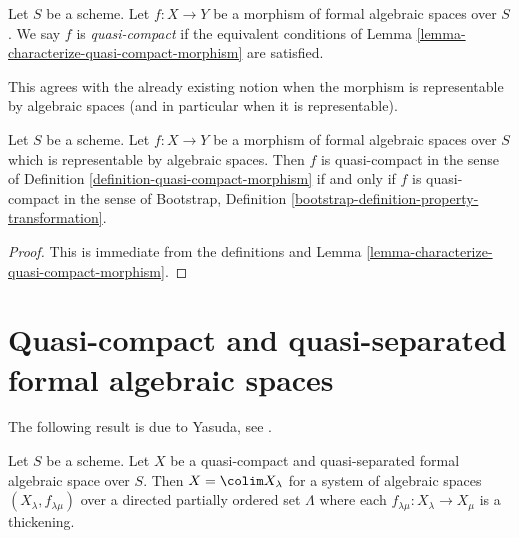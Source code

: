 \begin{definition}
\label{definition-quasi-compact-morphism}
Let $S$ be a scheme. Let $f : X \to Y$ be a morphism of
formal algebraic spaces over $S$.
We say $f$ is {\it quasi-compact} if the equivalent conditions of
Lemma \ref{lemma-characterize-quasi-compact-morphism} are satisfied.
\end{definition}

\noindent
This agrees with the already existing notion when the morphism
is representable by algebraic spaces (and in particular when it is
representable).

\begin{lemma}
\label{lemma-quasi-compact-representable}
Let $S$ be a scheme. Let $f : X \to Y$ be a morphism of formal algebraic
spaces over $S$ which is representable by algebraic spaces.
Then $f$ is quasi-compact in the sense of
Definition \ref{definition-quasi-compact-morphism}
if and only if $f$ is quasi-compact in the sense of
Bootstrap, Definition \ref{bootstrap-definition-property-transformation}.
\end{lemma}

\begin{proof}
This is immediate from the definitions and
Lemma \ref{lemma-characterize-quasi-compact-morphism}.
\end{proof}





\section{Quasi-compact and quasi-separated formal algebraic spaces}
\label{section-quasi-compact-quasi-separated}

\noindent
The following result is due to Yasuda, see
\cite[Proposition 3.32]{Yasuda}.

\begin{lemma}
\label{lemma-structure-quasi-compact-quasi-separated}
\begin{reference}
\cite[Proposition 3.32]{Yasuda}
\end{reference}
Let $S$ be a scheme. Let $X$ be a quasi-compact and quasi-separated
formal algebraic space over $S$. Then $X = \colim X_\lambda$
for a system of algebraic spaces $(X_\lambda, f_{\lambda \mu})$
over a directed partially ordered set $\Lambda$ where each
$f_{\lambda \mu} : X_\lambda \to X_\mu$ is a thickening.
\end{lemma}

